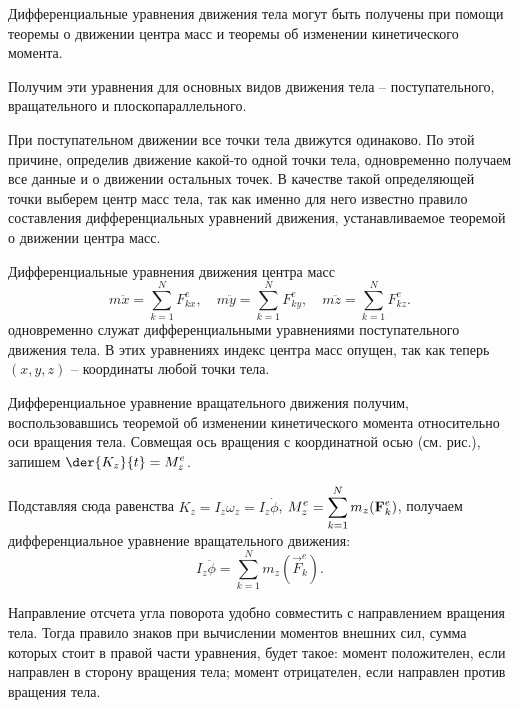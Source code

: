 Дифференциальные уравнения движения тела могут быть получены при помощи теоремы
о движении центра масс и теоремы об изменении кинетического момента.

Получим эти уравнения для основных видов движения тела -- поступательного,
вращательного и плоскопараллельного.

При поступательном движении все точки тела движутся одинаково. По этой причине,
определив движение какой-то одной точки тела, одновременно получаем все данные и
о движении остальных точек. В качестве такой определяющей точки выберем центр
масс тела, так как именно для него известно правило составления дифференциальных
уравнений движения, устанавливаемое теоремой о движении центра масс.

Дифференциальные уравнения движения центра масс
\[
    m\ddot{x} = \sum_{k=1}^N F^e_{kx}, \quad m\ddot{y} = \sum_{k=1}^N F^e_{ky},
    \quad m\ddot{z} = \sum_{k=1}^N F^e_{kz}.
\] 
одновременно служат дифференциальными уравнениями поступательного движения тела.
В этих уравнениях индекс центра масс опущен, так как теперь \( (x, y, z) \) --
координаты любой точки тела.

Дифференциальное уравнение вращательного движения получим, воспользовавшись
теоремой об изменении кинетического момента относительно оси вращения тела.
Совмещая ось вращения с координатной осью (см. рис.), запишем
\( \ds \der{K_z}{t} = M^e_z \).
 
Подставляя сюда равенства \( K_z = I_z\omega_z = I_z\dot{\phi} \),
\( \displaystyle M^e_z = \sum_{k=1}^N m_z(\mathbf{F}^e_k) \), получаем дифференциальное
уравнение вращательного движения:
\[
    I_z\ddot{\phi} = \sum_{k=1}^N m_z(\vec{F}^e_k).
\]
 
Направление отсчета угла поворота удобно совместить с направлением вращения
тела. Тогда правило знаков при вычислении моментов внешних сил, сумма которых
стоит в правой части уравнения, будет такое: момент положителен, если направлен
в сторону вращения тела; момент отрицателен, если направлен против вращения
тела.

\newpage
